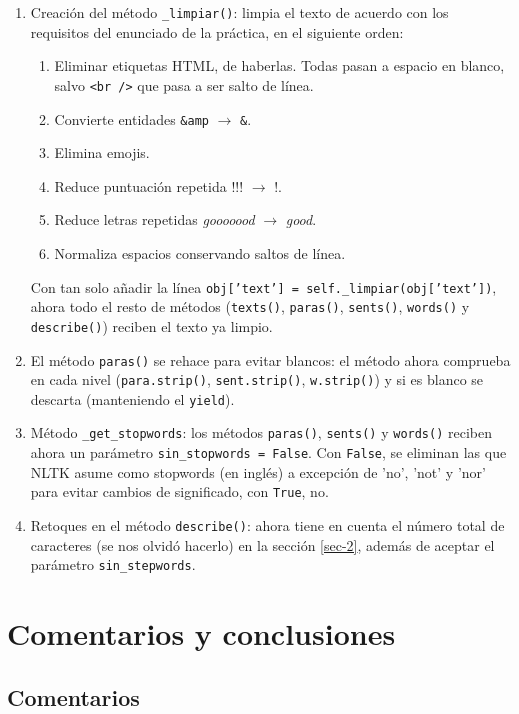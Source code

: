 \documentclass[10pt,a4paper]{article}
\begin{document}
\begin{enumerate}
    \item Creación del método \texttt{\_limpiar()}: limpia el texto de acuerdo con los requisitos del enunciado de la práctica, en 
    el siguiente orden: \begin{enumerate}
        \item Eliminar etiquetas HTML, de haberlas. Todas pasan a espacio en blanco, salvo \texttt{<br />} que pasa a ser salto de 
        línea. 
        \item Convierte entidades \texttt{\&amp} $\to$ \texttt{\&}. 
        \item Elimina emojis. 
        \item Reduce puntuación repetida !!! $\to$ !. 
        \item Reduce letras repetidas \textit{gooooood} $\to$ \textit{good}. 
        \item Normaliza espacios conservando saltos de línea. 
    \end{enumerate}
    Con tan solo añadir la línea \texttt{obj['text'] = self.\_limpiar(obj['text'])}, ahora todo el resto de métodos 
    (\texttt{texts()}, \texttt{paras()}, \texttt{sents()}, \texttt{words()} y \texttt{describe()}) reciben el texto ya limpio. 
    \item El método \texttt{paras()} se rehace para evitar blancos: el método ahora comprueba en cada nivel 
    (\texttt{para.strip()}, \texttt{sent.strip()}, \texttt{w.strip()}) y si es blanco se descarta (manteniendo el \texttt{yield}).
    \item Método \texttt{\_get\_stopwords}: los métodos \texttt{paras()}, \texttt{sents()} y \texttt{words()} reciben ahora
    un parámetro \texttt{sin\_stopwords = False}. Con \texttt{False}, se eliminan las que NLTK asume como stopwords (en inglés) 
    a excepción de 'no', 'not' y 'nor' para evitar cambios de significado, con \texttt{True}, no. 
    \item Retoques en el método \texttt{describe()}: ahora tiene en cuenta el número total de caracteres (se nos olvidó hacerlo)
    en la sección \ref{sec-2}, además de aceptar el parámetro \texttt{sin\_stepwords}. 
\end{enumerate}

\section{Comentarios y conclusiones}

\subsection{Comentarios}
\end{document}
